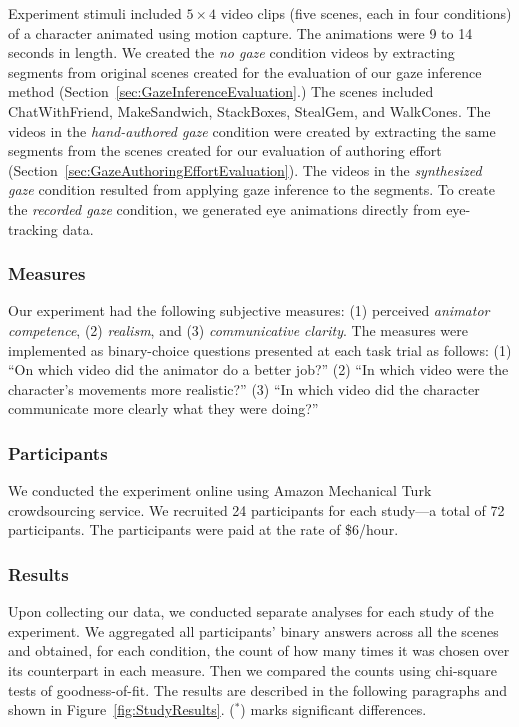 Experiment stimuli included $5 \times 4$ video clips (five scenes, each in four conditions) of a character animated using motion capture. The animations were 9 to 14 seconds in length. We created the \emph{no gaze} condition videos by extracting segments from original scenes created for the evaluation of our gaze inference method (Section~\ref{sec:GazeInferenceEvaluation}.) The scenes included ChatWithFriend, MakeSandwich, StackBoxes, StealGem, and WalkCones. The videos in the \emph{hand-authored gaze} condition were created by extracting the same segments from the scenes created for our evaluation of authoring effort (Section~\ref{sec:GazeAuthoringEffortEvaluation}). The videos in the \emph{synthesized gaze} condition resulted from applying gaze inference to the segments. To create the \emph{recorded gaze} condition, we generated eye animations directly from eye-tracking data.

\subsubsection{Measures}

Our experiment had the following subjective measures: (1) perceived \emph{animator competence}, (2) \emph{realism}, and (3) \emph{communicative clarity}. The measures were implemented as binary-choice questions presented at each task trial as follows: (1) ``On which video did the animator do a better job?'' (2) ``In which video were the character's movements more realistic?'' (3) ``In which video did the character communicate more clearly what they were doing?''

\subsubsection{Participants}

We conducted the experiment online using Amazon Mechanical Turk crowdsourcing service. We recruited 24 participants for each study---a total of 72 participants. The participants were paid at the rate of \$6/hour.

\subsubsection{Results}

Upon collecting our data, we conducted separate analyses for each study of the experiment. We aggregated all participants' binary answers across all the scenes and obtained, for each condition, the count of how many times it was chosen over its counterpart in each measure. Then we compared the counts using chi-square tests of goodness-of-fit. The results are described in the following paragraphs and shown in Figure~\ref{fig:StudyResults}. ($^*$) marks significant differences.

